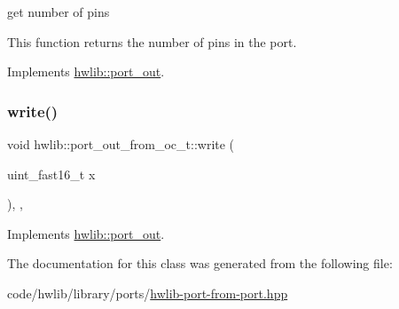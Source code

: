 get number of pins

This function returns the number of pins in the port. 

Implements \hyperlink{classhwlib_1_1port__out_a8593e2ff755b938797defb06c1e085df}{hwlib\+::port\+\_\+out}.

\mbox{\label{classhwlib_1_1port__out__from__oc__t_a33a024caac179b1d82b82d09bfca7645}} 
\subsubsection{\texorpdfstring{write()}{write()}}
{\footnotesize\ttfamily void hwlib\+::port\+\_\+out\+\_\+from\+\_\+oc\+\_\+t\+::write (\begin{DoxyParamCaption}\item[{uint\+\_\+fast16\+\_\+t}]{x }\end{DoxyParamCaption})\hspace{0.3cm}{\ttfamily [inline]}, {\ttfamily [override]}, {\ttfamily [virtual]}}







Implements \hyperlink{classhwlib_1_1port__out_a3644bf484ebe059ec5bf17fa43e0c01b}{hwlib\+::port\+\_\+out}.



The documentation for this class was generated from the following file\+:\begin{DoxyCompactItemize}
\item 
code/hwlib/library/ports/\hyperlink{hwlib-port-from-port_8hpp}{hwlib-\/port-\/from-\/port.\+hpp}\end{DoxyCompactItemize}
